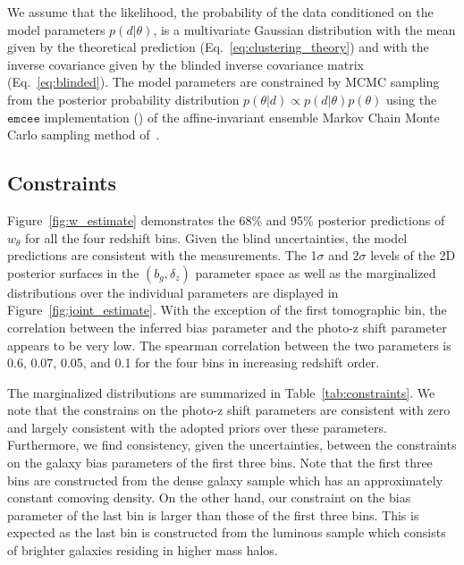 \documentclass[fleqn,usenatbib,useAMS]{mnras}
\begin{document}

We assume that the likelihood, the probability of the data conditioned on the model parameters $p(d|\theta)$, is a multivariate Gaussian distribution with the mean given by the theoretical prediction (Eq.~\ref{eq:clustering_theory}) and with the inverse covariance given by the blinded inverse covariance matrix (Eq.~\ref{eq:blinded}). The model parameters are constrained by MCMC sampling from the posterior probability distribution $p(\theta | d) \propto p(d|\theta)p(\theta)$ using the $\mathtt{emcee}$ implementation (\citealt{emcee}) of the affine-invariant ensemble Markov Chain Monte Carlo sampling method of~\citet{goodman2010}. 


\subsection{Constraints}

Figure~\ref{fig:w_estimate} demonstrates the 68\% and 95\% posterior predictions of $w_{\theta}$ for all the four redshift bins. Given the blind uncertainties, the model predictions are consistent with the measurements. 
The 1$\sigma$ and $2\sigma$ levels of the 2D posterior surfaces in the $(b_g, \delta_z)$ parameter space as well as the marginalized distributions over the individual parameters are displayed in Figure~\ref{fig:joint_estimate}. With the exception of the first tomographic bin, the correlation between the inferred bias parameter and the photo-z shift parameter appears to be very low. The spearman correlation between the two parameters is 0.6, 0.07, 0.05, and 0.1 for the four bins in increasing redshift order. 

The marginalized distributions are summarized in Table~\ref{tab:constraints}. We note that the constrains on the photo-z shift parameters are consistent with zero and largely consistent with the adopted priors over these parameters. Furthermore, we find consistency, given the uncertainties, between the constraints on the galaxy bias parameters of the first three bins. Note that the first three bins are constructed from the dense galaxy sample which has an approximately constant comoving density. On the other hand, our constraint on the bias parameter of the last bin is larger than those of the first three bins. This is expected as the  last bin is constructed from the luminous sample which consists of brighter galaxies residing in higher mass halos.
\end{document}

